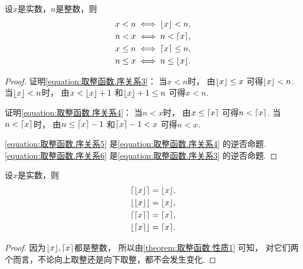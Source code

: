 \begin{property}
设\(x\)是实数，\(n\)是整数，则\begin{gather}
	x < n \iff \lfloor x\rfloor < n,
	\label{equation:取整函数.序关系3} \\
	n < x \iff n < \lceil x\rceil,
	\label{equation:取整函数.序关系4} \\
	x \leq n \iff \lceil x\rceil \leq n,
	\label{equation:取整函数.序关系5} \\
	n \leq x \iff n \leq \lfloor x\rfloor.
	\label{equation:取整函数.序关系6}
\end{gather}
\begin{proof}
证明\cref{equation:取整函数.序关系3}：
当\(x < n\)时，
由\(\lfloor x\rfloor \leq x\)
可得\(\lfloor x\rfloor < n\).
当\(\lfloor x\rfloor < n\)时，
由\(x < \lfloor x\rfloor + 1\)
和\(\lfloor x\rfloor + 1 \leq n\)
可得\(x < n\).

证明\cref{equation:取整函数.序关系4}：
当\(n < x\)时，
由\(x \leq \lceil x\rceil\)
可得\(n < \lceil x\rceil\).
当\(n < \lceil x\rceil\)时，
由\(n \leq \lceil x\rceil - 1\)
和\(\lceil x\rceil - 1 < x\)
可得\(n < x\).

\cref{equation:取整函数.序关系5} 是\cref{equation:取整函数.序关系4} 的逆否命题.
\cref{equation:取整函数.序关系6} 是\cref{equation:取整函数.序关系3} 的逆否命题.
\end{proof}
\end{property}

\begin{proposition}
设\(x\)是实数，则\begin{gather*}
	\lceil\lfloor x\rfloor\rceil = \lfloor x\rfloor, \\
	\lfloor\lfloor x\rfloor\rfloor = \lfloor x\rfloor, \\
	\lceil\lceil x\rceil\rceil = \lceil x\rceil, \\
	\lfloor\lceil x\rceil\rfloor = \lceil x\rceil.
\end{gather*}
\begin{proof}
因为\(\lfloor x\rfloor,\lceil x\rceil\)都是整数，
所以由\cref{theorem:取整函数.性质1} 可知，
对它们两个而言，不论向上取整还是向下取整，都不会发生变化.
\end{proof}
\end{proposition}

